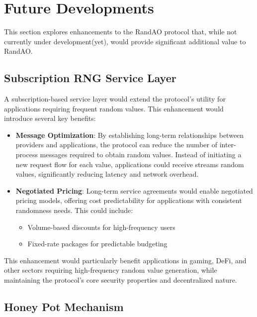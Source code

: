 \section{Future Developments}\label{sec:opportunities}

This section explores enhancements to the RandAO protocol that, while not currently under development(yet), would provide significant additional value to RandAO.

\subsection{Subscription RNG Service Layer}\label{sec:subscription_service}

A subscription-based service layer would extend the protocol's utility for applications requiring frequent random values. This enhancement would introduce several key benefits:

\begin{itemize}
    \item \textbf{Message Optimization}: By establishing long-term relationships between providers and applications, the protocol can reduce the number of inter-process messages required to obtain random values. Instead of initiating a new request flow for each value, applications could receive streams random values, significantly reducing latency and network overhead.
    
    \item \textbf{Negotiated Pricing}: Long-term service agreements would enable negotiated pricing models, offering cost predictability for applications with consistent randomness needs. This could include:
    \begin{itemize}
        \item Volume-based discounts for high-frequency users
        \item Fixed-rate packages for predictable budgeting
    \end{itemize}
\end{itemize}

This enhancement would particularly benefit applications in gaming, DeFi, and other sectors requiring high-frequency random value generation, while maintaining the protocol's core security properties and decentralized nature.

\subsection{Honey Pot Mechanism}\label{sec:honey_pot}

